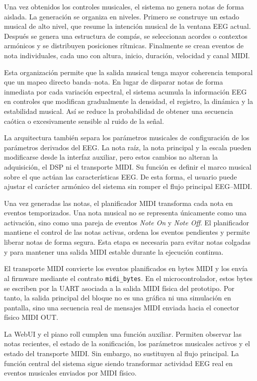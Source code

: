 \documentclass[../main.tex]{subfiles}
\begin{document}
Una vez obtenidos los controles musicales, el sistema no genera notas de forma aislada. La generación se organiza en niveles. Primero se construye un estado musical de alto nivel, que resume la intención musical de la ventana EEG actual. Después se genera una estructura de compás, se seleccionan acordes o contextos armónicos y se distribuyen posiciones rítmicas. Finalmente se crean eventos de nota individuales, cada uno con altura, inicio, duración, velocidad y canal MIDI.

Esta organización permite que la salida musical tenga mayor coherencia temporal que un mapeo directo banda--nota. En lugar de disparar notas de forma inmediata por cada variación espectral, el sistema acumula la información EEG en controles que modifican gradualmente la densidad, el registro, la dinámica y la estabilidad musical. Así se reduce la probabilidad de obtener una secuencia caótica o excesivamente sensible al ruido de la señal.

La arquitectura también separa los parámetros musicales de configuración de los parámetros derivados del EEG. La nota raíz, la nota principal y la escala pueden modificarse desde la interfaz auxiliar, pero estos cambios no alteran la adquisición, el DSP ni el transporte MIDI. Su función es definir el marco musical sobre el que actúan las características EEG. De esta forma, el usuario puede ajustar el carácter armónico del sistema sin romper el flujo principal EEG--MIDI.

Una vez generadas las notas, el planificador MIDI transforma cada nota en eventos temporizados. Una nota musical no se representa únicamente como una activación, sino como una pareja de eventos \textit{Note On} y \textit{Note Off}. El planificador mantiene el control de las notas activas, ordena los eventos pendientes y permite liberar notas de forma segura. Esta etapa es necesaria para evitar notas colgadas y para mantener una salida MIDI estable durante la ejecución continua.

El transporte MIDI convierte los eventos planificados en bytes MIDI y los envía al firmware mediante el contrato \texttt{midi\_bytes}. En el microcontrolador, estos bytes se escriben por la UART asociada a la salida MIDI física del prototipo. Por tanto, la salida principal del bloque no es una gráfica ni una simulación en pantalla, sino una secuencia real de mensajes MIDI enviada hacia el conector físico MIDI OUT.

La WebUI y el piano roll cumplen una función auxiliar. Permiten observar las notas recientes, el estado de la sonificación, los parámetros musicales activos y el estado del transporte MIDI. Sin embargo, no sustituyen al flujo principal. La función central del sistema sigue siendo transformar actividad EEG real en eventos musicales enviados por MIDI físico.
\end{document}
